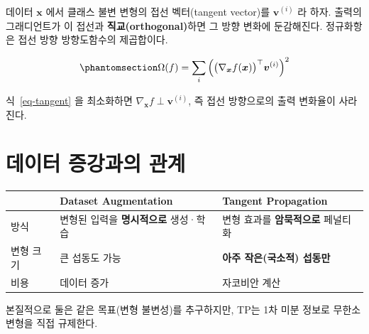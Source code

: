 \documentclass[
  letterpaper,
  DIV=11,
  numbers=noendperiod]{scrreprt}
\newcounter{none} %
\begin{document}
데이터 \(\bm{x}\) 에서 클래스 불변 변형의 접선 벡터(tangent vector)를
\(\bm{v}^{(i)}\) 라 하자. 출력의 그래디언트가 이 접선과
\textbf{직교(orthogonal)}하면 그 방향 변화에 둔감해진다. 정규화항은 접선
방향 방향도함수의 제곱합이다.

\begin{equation}\protect\phantomsection\label{eq-tangent}{
\Omega(f) = \sum_{i}\Big(\big(\nabla_{\bm{x}} f(\bm{x})\big)^\top \bm{v}^{(i)}\Big)^2
}\end{equation}

식~\ref{eq-tangent} 을 최소화하면
\(\nabla_{\bm{x}} f \perp \bm{v}^{(i)}\), 즉 접선 방향으로의 출력
변화율이 사라진다.

\section{데이터 증강과의
관계}\label{uxb370uxc774uxd130-uxc99duxac15uxacfcuxc758-uxad00uxacc4}

{\def\LTcaptype{none} %
\begin{longtable}[]{@{}
  >{\raggedright\arraybackslash}p{}
  >{\raggedright\arraybackslash}p{}
  >{\raggedright\arraybackslash}p{}@{}}
\toprule\noalign{}
\begin{minipage}[b]{\linewidth}\raggedright
\end{minipage} & \begin{minipage}[b]{\linewidth}\raggedright
Dataset Augmentation
\end{minipage} & \begin{minipage}[b]{\linewidth}\raggedright
Tangent Propagation
\end{minipage} \\
\midrule\noalign{}
\endhead
\bottomrule\noalign{}
\endlastfoot
방식 & 변형된 입력을 \textbf{명시적으로} 생성·학습 & 변형 효과를
\textbf{암묵적으로} 페널티화 \\
변형 크기 & 큰 섭동도 가능 & \textbf{아주 작은(국소적) 섭동만} \\
비용 & 데이터 증가 & 자코비안 계산 \\
\end{longtable}
}

본질적으로 둘은 같은 목표(변형 불변성)를 추구하지만, TP는 1차 미분
정보로 무한소 변형을 직접 규제한다.
\end{document}
